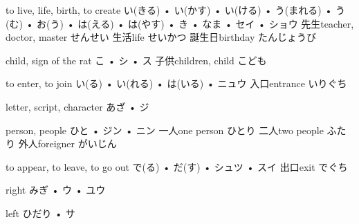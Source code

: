 



\setcounter{cardnum}{49}

		{to live, life, birth, to create}
		{い(きる) • い(かす) • い(ける) • う(まれる) • う(む) • お(う) • は(える) • は(やす) • き • なま • セイ • ショウ}
		{先生}{teacher, doctor, master せんせい}
		{生活}{life せいかつ}
		{誕生日}{birthday たんじょうび}
		{}{}
		{}{}

		{child, sign of the rat}
		{こ • シ • ス}
		{子供}{children, child こども}
		{}{}
		{}{}
		{}{}
		{}{}

		{to enter, to join}
		{い(る) • い(れる) • は(いる) • ニュウ}
		{入口}{entrance いりぐち}
		{}{}
		{}{}
		{}{}
		{}{}

		{letter, script, character}
		{あざ • ジ}
		{}{}
		{}{}
		{}{}
		{}{}
		{}{}

		{person, people}
		{ひと • ジン • ニン}
		{一人}{one person ひとり}
		{二人}{two people ふたり}
		{外人}{foreigner がいじん}
		{}{}
		{}{}

		{to appear, to leave, to go out}
		{で(る) • だ(す) • シュツ • スイ}
		{出口}{exit でぐち}
		{}{}
		{}{}
		{}{}
		{}{}

		{right}
		{みぎ • ウ • ユウ}
		{}{}
		{}{}
		{}{}
		{}{}
		{}{}

		{left}
		{ひだり • サ}
		{}{}
		{}{}
		{}{}
		{}{}
		{}{}

